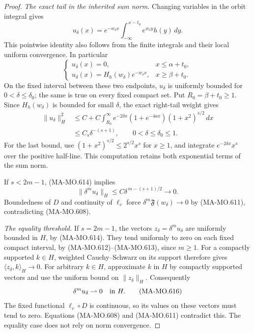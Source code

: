 \begin{proof}
\emph{The exact tail in the inherited sum norm.}
Changing variables in the orbit integral gives
\[
 u_\delta(x)=e^{-w_\delta x}
       \int_{-\infty}^{\,x-t_0}e^{w_\delta y}h(y)\,dy .
 \tag{MA-MO.612}
\]
This pointwise identity also follows from the finite
integrals and their local uniform convergence.
In particular
\[
 \begin{cases}
 u_\delta(x)=0,&x\le\alpha+t_0,\\
 u_\delta(x)=H_h(w_\delta)e^{-w_\delta x},
                                      &x\ge\beta+t_0 .
 \end{cases}
 \tag{MA-MO.613}
\]
On the fixed interval between these two endpoints,
\(u_\delta\) is uniformly bounded for
\(0<\delta\le\delta_0\); the same is true on every
fixed compact set. Put \(R_0=\beta+t_0\ge1\).
Since \(H_h(w_\delta)\) is bounded for small \(\delta\),
the exact right-tail weight gives
\[
 \begin{aligned}
 \|u_\delta\|_H^2
 &\le C+
 C\int_{R_0}^{\infty}e^{-2\delta x}
             (1+e^{-4ax})(1+x^2)^{s/2}\,dx\\
 &\le C_s\delta^{-(s+1)},\qquad 0<\delta\le\delta_0\le1 .
 \end{aligned}
 \tag{MA-MO.614}
\]
For the last bound, use
\((1+x^2)^{s/2}\le 2^{s/2}x^s\) for \(x\ge1\),
and integrate \(e^{-2\delta x}x^s\) over the positive
half-line. This computation retains both exponential
terms of the sum norm.

If \(s<2m-1\), (MA-MO.614) implies
\[
       \|\delta^m u_\delta\|_H
          \le C\delta^{\,m-(s+1)/2}\longrightarrow0 .
 \tag{MA-MO.615}
\]
Boundedness of \(D\) and continuity of \(\ell_v\) force
\(\delta^m\mathfrak F(w_\delta)\to0\) by
(MA-MO.611), contradicting (MA-MO.608).

\emph{The equality threshold.}
If \(s=2m-1\), the vectors
\(z_\delta=\delta^m u_\delta\) are uniformly bounded
in \(H\), by (MA-MO.614).
They tend uniformly to zero on each fixed compact
interval, by (MA-MO.612)--(MA-MO.613), since \(m\ge1\).
For a compactly supported \(k\in H\), weighted
Cauchy--Schwarz on its support therefore gives
\(\langle z_\delta,k\rangle_H\to0\).
For arbitrary \(k\in H\), approximate \(k\) in \(H\)
by compactly supported vectors and use the uniform
bound on \(\|z_\delta\|_H\). Consequently
\[
                 \delta^m u_\delta
                       \rightharpoonup0\quad\hbox{in }H .
 \tag{MA-MO.616}
\]
The fixed functional \(\ell_v\circ D\) is continuous,
so its values on these vectors must tend to zero.
Equations (MA-MO.608) and (MA-MO.611) contradict this.
The equality case does not rely on norm convergence.


\end{proof}
